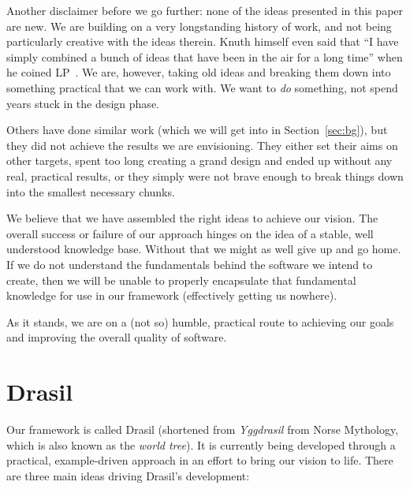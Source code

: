 \documentclass[preprint, 10pt]{sigplanconf}
\begin{document}
Another disclaimer before we go further: none of the ideas presented
in this paper are new. We are building on a very longstanding history of work,
and not being particularly creative with the ideas therein. Knuth himself even
said that ``I have simply combined a bunch of ideas that have been in the air
for a long time'' when he coined LP~\cite{Knuth1984}. We are, however, taking old
ideas and breaking them down into something practical that we can work with. We
want to \emph{do} something, not spend years stuck in the design phase.

Others have done similar work (which we will get into in Section~\ref{sec:bg}),
but they did not achieve the results we are envisioning. They either set their
aims on other targets, spent too long creating a grand design and ended up
without any real, practical results, or they simply were not brave enough to
break things down into the smallest necessary chunks.

We believe that we have assembled the right ideas to achieve our vision.
The overall success or failure of our approach hinges on the idea of a stable,
well understood knowledge base. Without that we might as well give up and go
home. If we do not understand the fundamentals behind the software we intend to
create, then we will be unable to properly encapsulate that fundamental
knowledge for use in our framework (effectively getting us nowhere).

As it stands, we are on a (not so) humble, practical route to achieving our
goals and improving the overall quality of software.

\section{Drasil}
\label{sec:Drasil}

Our framework is called Drasil (shortened from \emph{Yggdrasil} from Norse
Mythology, which is also known as the \emph{world tree}). It is currently being
developed through a practical, example-driven approach in an effort to bring our
vision to life. There are three main ideas driving Drasil's development:
\end{document}
